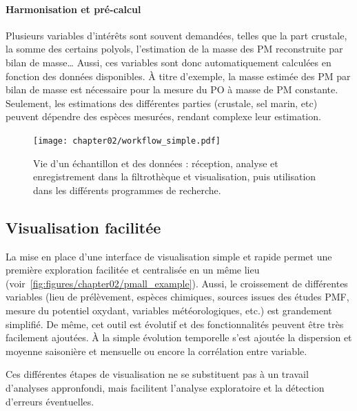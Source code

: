 \paragraph{Harmonisation et pré-calcul}%
\label{par:harmonisation_et_pré_calcul}

Plusieurs variables d'intérêts sont souvent demandées, telles que la part crustale, la
somme des certains polyols, l'estimation de la masse des PM reconstruite par bilan de
masse… Aussi, ces variables sont donc automatiquement calculées en fonction des données
disponibles. À titre d'exemple, la masse estimée des PM par bilan de masse est nécessaire
pour la mesure du PO à masse de PM constante. Seulement, les estimations des différentes
parties (crustale, sel marin, etc) peuvent dépendre des espèces mesurées, rendant complexe
leur estimation.

\begin{landscape}
\begin{figure}[ht]
    \centering
    \texttt{[image: chapter02/workflow\_simple.pdf]}
    \caption{Vie d'un échantillon et des données : réception, analyse et enregistrement
        dans la filtrothèque et visualisation, puis utilisation dans les différents
        programmes de recherche.}%
    \label{fig:bdd}
\end{figure}
\end{landscape}

\subsection{Visualisation facilitée}%
\label{sub:visualisation_facilité}

La mise en place d'une interface de visualisation simple et rapide permet une première
exploration facilitée et centralisée en un même lieu
(voir~\ref{fig:figures/chapter02/pmall_example}). Aussi, le croissement de différentes
variables (lieu de prélèvement, espèces chimiques, sources issues des études PMF, mesure
du potentiel oxydant, variables météorologiques, etc.) est grandement simplifié.  De même,
cet outil est évolutif et des fonctionnalités peuvent être très facilement ajoutées. À la
simple évolution temporelle s'est ajoutée la dispersion et moyenne saisonière et mensuelle
ou encore la corrélation entre variable.

Ces différentes étapes de visualisation ne se substituent pas à un travail d'analyses
appronfondi, mais facilitent l'analyse exploratoire et la détection d'erreurs éventuelles.

